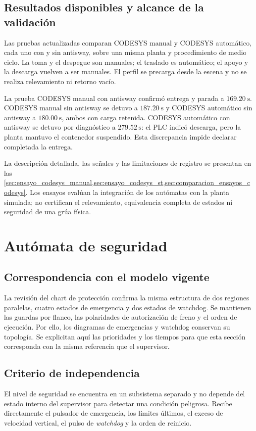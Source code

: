 \documentclass[a4paper,10pt,onecolumn,journal]{ieeeconf}
\numberwithin{equation}{section}
\begin{document}
\subsection{Resultados disponibles y alcance de la validación}
Las pruebas actualizadas comparan CODESYS manual y CODESYS automático, cada uno con y sin antisway, sobre una misma planta y procedimiento de medio ciclo. La toma y el despegue son manuales; el traslado es automático; el apoyo y la descarga vuelven a ser manuales. El perfil se precarga desde la escena y no se realiza relevamiento ni retorno vacío.

La prueba CODESYS manual con antisway confirmó entrega y parada a $169.20~\mathrm{s}$. CODESYS manual sin antisway se detuvo a $187.20~\mathrm{s}$ y CODESYS automático sin antisway a $180.00~\mathrm{s}$, ambos con carga retenida. CODESYS automático con antisway se detuvo por diagnóstico a $279.52~\mathrm{s}$: el PLC indicó descarga, pero la planta mantuvo el contenedor suspendido. Esta discrepancia impide declarar completada la entrega.

La descripción detallada, las señales y las limitaciones de registro se presentan en las \cref{sec:ensayo_codesys_manual,sec:ensayo_codesys_st,sec:comparacion_ensayos_codesys}. Los ensayos evalúan la integración de los autómatas con la planta simulada; no certifican el relevamiento, equivalencia completa de estados ni seguridad de una grúa física.

\clearpage
\section{Autómata de seguridad}
\subsection{Correspondencia con el modelo vigente}
La revisión del chart de protección confirma la misma estructura de dos regiones paralelas, cuatro estados de emergencia y dos estados de watchdog. Se mantienen las guardas por flanco, las polaridades de autorización de freno y el orden de ejecución. Por ello, los diagramas de emergencias y watchdog conservan su topología. Se explicitan aquí las prioridades y los tiempos para que esta sección corresponda con la misma referencia que el supervisor.

\subsection{Criterio de independencia}
El nivel de seguridad se encuentra en un subsistema separado y no depende del estado interno del supervisor para detectar una condición peligrosa. Recibe directamente el pulsador de emergencia, los límites últimos, el exceso de velocidad vertical, el pulso de \textit{watchdog} y la orden de reinicio.
\end{document}
